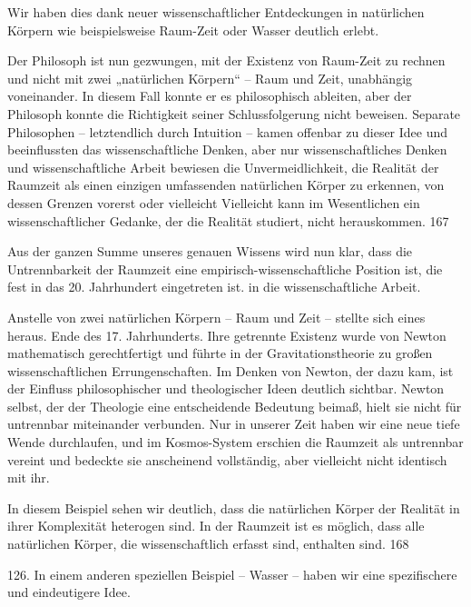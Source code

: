 \documentclass[11pt,a4paper]{book}
\begin{document}
Wir haben dies dank neuer wissenschaftlicher Entdeckungen in natürlichen Körpern wie beispielsweise Raum-Zeit oder Wasser deutlich erlebt.



Der Philosoph ist nun gezwungen, mit der Existenz von Raum-Zeit zu rechnen und nicht mit zwei „natürlichen Körpern“ -- Raum und Zeit, unabhängig voneinander. In diesem Fall konnte er es philosophisch ableiten, aber der Philosoph konnte die Richtigkeit seiner Schlussfolgerung nicht beweisen. Separate Philosophen -- letztendlich durch Intuition -- kamen offenbar zu dieser Idee und beeinflussten das wissenschaftliche Denken, aber nur wissenschaftliches Denken und wissenschaftliche Arbeit bewiesen die Unvermeidlichkeit, die Realität der Raumzeit als einen einzigen umfassenden natürlichen Körper zu erkennen, von dessen Grenzen vorerst oder vielleicht Vielleicht kann im Wesentlichen ein wissenschaftlicher Gedanke, der die Realität studiert, nicht herauskommen. 167



Aus der ganzen Summe unseres genauen Wissens wird nun klar, dass die Untrennbarkeit der Raumzeit eine empirisch-wissenschaftliche Position ist, die fest in das 20. Jahrhundert eingetreten ist. in die wissenschaftliche Arbeit.



Anstelle von zwei natürlichen Körpern -- Raum und Zeit -- stellte sich eines heraus. Ende des 17. Jahrhunderts. Ihre getrennte Existenz wurde von Newton mathematisch gerechtfertigt und führte in der Gravitationstheorie zu großen wissenschaftlichen Errungenschaften. Im Denken von Newton, der dazu kam, ist der Einfluss philosophischer und theologischer Ideen deutlich sichtbar. Newton selbst, der der Theologie eine entscheidende Bedeutung beimaß, hielt sie nicht für untrennbar miteinander verbunden. Nur in unserer Zeit haben wir eine neue tiefe Wende durchlaufen, und im Kosmos-System erschien die Raumzeit als untrennbar vereint und bedeckte sie anscheinend vollständig, aber vielleicht nicht identisch mit ihr.



In diesem Beispiel sehen wir deutlich, dass die natürlichen Körper der Realität in ihrer Komplexität heterogen sind. In der Raumzeit ist es möglich, dass alle natürlichen Körper, die wissenschaftlich erfasst sind, enthalten sind. 168



126. In einem anderen speziellen Beispiel -- Wasser -- haben wir eine spezifischere und eindeutigere Idee.
\end{document}
